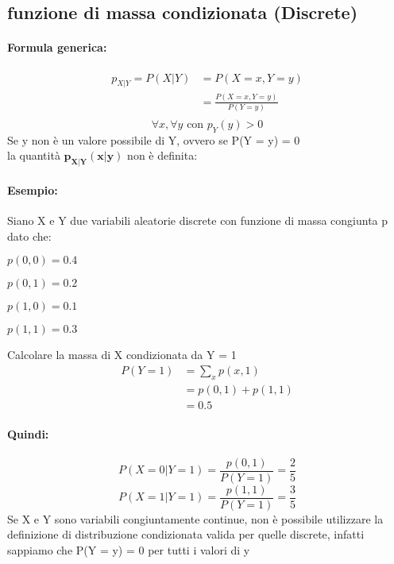 \documentclass[]{article}
\newcommand{\formula}{\paragraph{Formula generica:}}
\begin{document}
    \subsection{funzione di massa condizionata (Discrete)}
    \formula
    \begin{equation*}
        \begin{split}
            p_{X|Y}= P(X | Y) & = P (X=x, Y=y) \\
            & = \frac{P(X=x, Y=y)}{P(Y=y)} \\
        \end{split}
    \end{equation*}
    \[ \forall x, \forall y \text{ con } p_Y(y) > 0\]
    \linebreak[4]
    Se y non è un valore possibile di Y, ovvero se P(Y = y) = 0 \\
    la quantità $\boldsymbol{p_{X|Y}(x|y)}$ non è definita:
    
    \paragraph{Esempio:} Siano X e Y due variabili aleatorie discrete con funzione di massa congiunta p dato che: 
    \begin{center}
        \begin{minipage}{0.2\textwidth}
            $p(0,0) = 0.4$
        \end{minipage}
        \begin{minipage}{0.2\textwidth}
            $p(0,1) = 0.2$
        \end{minipage}
        \begin{minipage}{0.2\textwidth}
            $p(1,0) = 0.1$
        \end{minipage}
        \begin{minipage}{0.2\textwidth}
            $p(1,1) = 0.3$
        \end{minipage}
    \end{center}
    Calcolare la massa di X condizionata da Y = 1
    \begin{equation*}
        \begin{split}
            P(Y = 1) &= \sum_{x}^{} p(x, 1) \\
            &= p(0,1) + p(1,1) \\
            &= 0.5
        \end{split}
    \end{equation*}
    \paragraph{Quindi:}
    \[ P(X = 0 | Y = 1) = \frac{p(0,1)}{P(Y = 1)} = \frac{2}{5} \]
    \[ P(X = 1 | Y = 1) = \frac{p(1,1)}{P(Y = 1)} = \frac{3}{5} \]
    Se X e Y sono variabili congiuntamente continue, non è possibile utilizzare la
    definizione di distribuzione condizionata valida per quelle discrete, infatti sappiamo
    che P(Y = y) = 0 per tutti i valori di y
\end{document}
